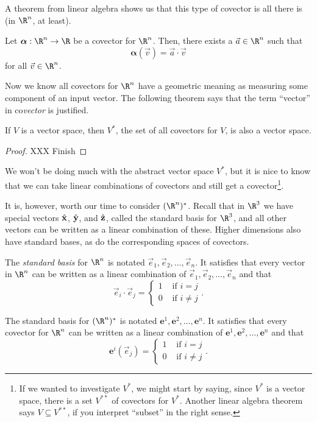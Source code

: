 A theorem from linear algebra shows us that this type of covector
is all there is (in $\R^n$, at least).

\begin{theorem}
	Let $\bm\alpha:\R^n\to \R$ be a covector for $\R^n$.  Then,
	there exists a $\vec a\in \R^n$ such that
	\[
		\bm\alpha (\vec v) = \vec a\cdot \vec v
	\]
	for all $\vec v\in\R^n$.
\end{theorem}


Now we know all covectors for $\R^n$ have a geometric meaning
as measuring some component of an input vector.  The following
theorem says that the term ``vector'' in co\emph{vector} is justified.

\begin{theorem}
	If $V$ is a vector space, then $V^*$, the set of all
	covectors for $V$, is also a vector space.
\end{theorem}
\begin{proof}
	XXX Finish
\end{proof}

We won't be doing much with the abstract vector space $V^*$, but it is
nice to know that we can take linear combinations of covectors
and still get a covector\footnote{ If we wanted to investigate $V^*$,
we might start by saying, since $V^*$ is a vector space, there is
a set $V^{**}$ of covectors for $V^*$.  Another linear algebra theorem
says $V\subseteq V^{**}$, if you interpret ``subset'' in the right sense. }.

It is, however, worth our time to consider $(\R^n)^*$.  Recall that
in $\R^3$ we have special vectors ${\hat {\mathbf x}}$, ${\hat {\mathbf y}}$, and ${\hat {\mathbf z}}$,
called the standard basis for $\R^3$,
and all other vectors can be written as a linear combination of these.
Higher dimensions also have standard bases, as do the corresponding
spaces of covectors.

\begin{definition}
	The \emph{standard basis} for $\R^n$ is notated 
	$\vec e_1,\vec e_2,\ldots,\vec e_n$. It satisfies that 
	every vector in $\R^n$ can be written as a linear combination of
	$\vec e_1,\vec e_2,\ldots,\vec e_n$ and that
	\[
		\vec e_i\cdot \vec e_j = \begin{cases}
			1 &\text{ if } i=j\\
			0 &\text{ if } i\neq j
		\end{cases}.
	\]

	The standard basis for $(\R^n)^*$ is notated
	$\bm e^1,\bm e^2,\ldots,\bm e^n$. It satisfies that
	every covector for $\R^n$ can be written as a linear combination of
	$\bm e^1,\bm e^2,\ldots,\bm e^n$ and that
	\[
		\bm e^i(\vec e_j) = \begin{cases}
			1 &\text{ if } i=j\\
			0 &\text{ if } i\neq j
		\end{cases}.
	\]
\end{definition}


